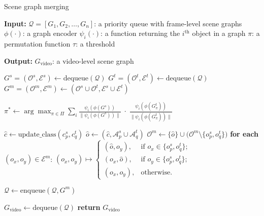 
\begin{algorithm}[t]
\caption{Scene graph merging}
\label{alg:hierarchical_graph_merge}
\begin{algorithmic}[1]

  \STATE \textbf{Input:} 
  \STATE \quad $\mathcal{Q} = [ G_1, G_2, \dots, G_n ]$: a priority queue with frame-level scene graphs
  \STATE \quad $\phi(\cdot)$: a graph encoder
  \STATE \quad $\psi_i(\cdot)$: a function returning the $i^\text{th}$ object in a graph
  \STATE \quad $\pi$: a permutation function
  \STATE \quad $\tau$: a threshold

  \STATE \textbf{Output:} $G_{\text{video}}$: a video-level scene graph

    \STATE $G^s = (\mathcal{O}^s, \mathcal{E}^s) \gets \text{dequeue}(\mathcal{Q})$
    \STATE $G^t = (\mathcal{O}^t, \mathcal{E}^t) \gets \text{dequeue}(\mathcal{Q})$
    \STATE $G^m = (\mathcal{O}^m, \mathcal{E}^m) \gets (\mathcal{O}^s \cup \mathcal{O}^t, \mathcal{E}^s \cup \mathcal{E}^t)$

    \STATE $\pi^* \gets \displaystyle \arg\max_{\pi \in \Pi} \sum_{i} 
      \frac{\psi_i(\phi(G^s))}{\lVert \psi_i(\phi(G^s)) \rVert} \; \cdot \;
      \frac{\psi_i(\phi(G_{\pi}^t))}{\lVert \psi_i(\phi(G_{\pi}^t)) \rVert}$

      \STATE $\hat{c} \gets \text{update\_class}(c^s_p, c^t_q)$
      \STATE $\hat{o} \gets (\hat{c}, \mathcal{A}^s_p \cup \mathcal{A}^t_q)$
      \STATE $\mathcal{O}^m \gets \{\hat{o}\} \cup \bigl(\mathcal{O}^m \setminus \{o^s_p, o^t_q\}\bigr)$
      \STATE \textbf{for each} $(o_x, o_y) \in \mathcal{E}^m$:
      \STATE \quad $(o_x, o_y) \mapsto 
        \begin{cases}
           (\hat{o}, o_y), & \text{if } o_x \in \{ o_p^s, o_q^t \}; \\
           (o_x, \hat{o}), & \text{if } o_y \in \{ o_p^s, o_q^t \}; \\
           (o_x, o_y), & \text{otherwise.}
        \end{cases}$
    \ENDFOR

    \STATE $\mathcal{Q} \gets \text{enqueue}(\mathcal{Q}, G^m)$
  \ENDWHILE

  \STATE $G_{\text{video}} \gets \text{dequeue}(\mathcal{Q})$
  \STATE \textbf{return} $G_{\text{video}}$

\end{algorithmic}
\end{algorithm}